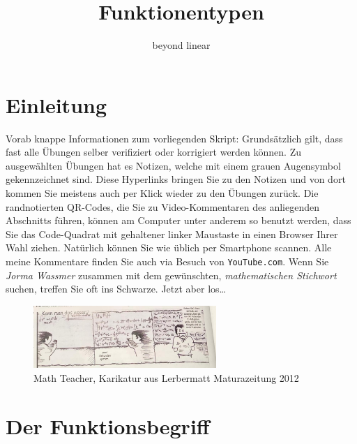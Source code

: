 \documentclass[%
11pt,%
twoside,%
titlepage,%
german,%
headsepline%
]{scrartcl}
\title{Funktionentypen}
\subtitle{beyond linear}
\author{}
\date{}
\begin{document}
\maketitle
\tableofcontents
\cleardoublepage

\section{Einleitung}

Vorab knappe Informationen zum vorliegenden Skript: Grunds\"atzlich gilt, dass fast alle \"Ubungen selber verifiziert oder korrigiert werden k\"onnen. Zu ausgew\"ahlten \"Ubungen hat es Notizen, welche mit einem grauen Augensymbol gekennzeichnet sind. Diese Hyperlinks bringen Sie zu den Notizen und von dort kommen Sie meistens auch per Klick wieder zu den \"Ubungen zur\"uck. Die randnotierten QR-Codes, die Sie zu Video-Kommentaren des anliegenden Abschnitts f\"uhren,  k\"onnen am Computer unter anderem so benutzt werden, dass Sie das Code-Quadrat mit gehaltener linker Maustaste in einen Browser Ihrer Wahl ziehen. Nat\"urlich k\"onnen Sie wie \"ublich per Smartphone scannen. Alle meine Kommentare finden Sie auch via Besuch von \texttt{YouTube.com}. Wenn Sie \emph{Jorma Wassmer} zusammen mit dem gew\"unschten, \emph{mathematischen Stichwort} suchen, treffen Sie oft ins Schwarze. Jetzt aber los\dots\\

\begin{figure}[htbp]
\begin{center}
	\includegraphics[width=0.618\textwidth]{pictures/teacher_me.jpg}
\caption{Math Teacher, Karikatur aus Lerbermatt Maturazeitung 2012}
\label{default}
\end{center}
\end{figure}


\clearpage

\section{Der Funktionsbegriff}
\end{document}
